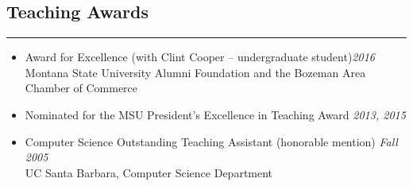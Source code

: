 \subsection*{Teaching Awards}
\hrule
\vspace{0.2cm}
\begin{itemize}

    \item Award for Excellence (with Clint Cooper -- undergraduate
    student)\hfill {\it 2016} \\
    Montana State University Alumni Foundation and the Bozeman Area Chamber of
    Commerce

    \item Nominated for the MSU President's Excellence in Teaching Award \hfill
    \textit{2013, 2015}

    \item  Computer Science Outstanding Teaching Assistant (honorable mention)
    \hfill {\it Fall 2005}\\
    UC Santa Barbara, Computer Science Department


\end{itemize}